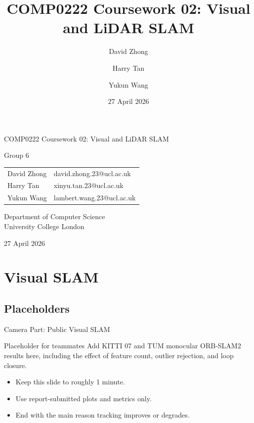 \documentclass[aspectratio=169]{beamer}
\title[COMP0222 CW2]{COMP0222 Coursework 02: Visual and LiDAR SLAM}
\author[Group 6]{David Zhong \and Harry Tan \and Yukun Wang}
\institute[UCL]{Department of Computer Science \\ University College London}
\date{27 April 2026}
\newcommand{\placeholderbox}[2]{%
  \begin{block}{#1}
    \large #2
  \end{block}
}
\begin{document}
\begin{frame}{}
  \centering
  \vspace{0.8em}
  {\Large COMP0222 Coursework 02: Visual and LiDAR SLAM}

  \vspace{0.8em}
  {\large Group 6}

  \vspace{0.8em}
  \small
  \begin{tabular}{ll}
    David Zhong & david.zhong.23@ucl.ac.uk \\
    Harry Tan & xinyu.tan.23@ucl.ac.uk \\
    Yukun Wang & lambert.wang.23@ucl.ac.uk \\
  \end{tabular}

  \vspace{0.8em}
  Department of Computer Science \\
  University College London

  \vspace{0.8em}
  27 April 2026
\end{frame}

\section{Visual SLAM}
\subsection{Placeholders}

\begin{frame}{Camera Part: Public Visual SLAM}
  \placeholderbox{Placeholder for teammates}{%
    Add KITTI 07 and TUM monocular ORB-SLAM2 results here, including the effect of feature count, outlier rejection, and loop closure.}

  \vfill
  \begin{itemize}
    \item Keep this slide to roughly 1 minute.
    \item Use report-submitted plots and metrics only.
    \item End with the main reason tracking improves or degrades.
  \end{itemize}
\end{frame}
\end{document}
